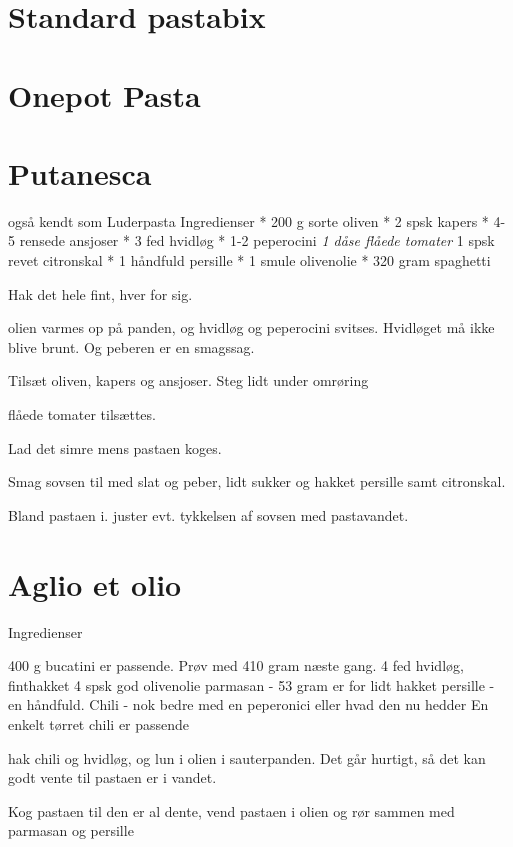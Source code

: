 \documentclass[
]{book}
\begin{document}
\section{Standard pastabix}\label{standard-pastabix}

\section{Onepot Pasta}\label{onepot-pasta}

\section{Putanesca}\label{putanesca}

også kendt som Luderpasta
Ingredienser
* 200 g sorte oliven
* 2 spsk kapers
* 4-5 rensede ansjoser
* 3 fed hvidløg
* 1-2 peperocini
\emph{1 dåse flåede tomater
} 1 spsk revet citronskal
* 1 håndfuld persille
* 1 smule olivenolie
* 320 gram spaghetti

Hak det hele fint, hver for sig.

olien varmes op på panden, og hvidløg og peperocini svitses. Hvidløget må ikke blive brunt. Og peberen er en smagssag.

Tilsæt oliven, kapers og ansjoser. Steg lidt under omrøring

flåede tomater tilsættes.

Lad det simre mens pastaen koges.

Smag sovsen til med slat og peber, lidt sukker og hakket persille samt citronskal.

Bland pastaen i. juster evt. tykkelsen af sovsen med pastavandet.

\section{Aglio et olio}\label{aglio-et-olio}

Ingredienser

400 g bucatini er passende. Prøv med 410 gram næste gang.
4 fed hvidløg, finthakket
4 spsk god olivenolie
parmasan - 53 gram er for lidt
hakket persille - en håndfuld.
Chili - nok bedre med en peperonici eller hvad den nu hedder En enkelt tørret chili er passende

hak chili og hvidløg, og lun i olien i sauterpanden. Det går hurtigt, så det kan godt vente til pastaen er i vandet.

Kog pastaen til den er al dente,
vend pastaen i olien og rør sammen med parmasan og persille
\end{document}
